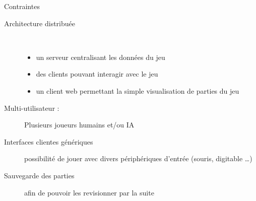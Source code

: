 \begin{frame}[c]
  \begin{block}{Contraintes}
\begin{description}
\item[Architecture distribuée]
~
  \begin{itemize}
  \item un serveur centralisant les données du jeu
  \item des clients pouvant interagir avec le jeu
  \item un client web permettant la simple visualisation de parties du jeu
  \end{itemize}
\item[Multi-utilisateur :] Plusieurs joueurs humains et/ou IA 
\item[Interfaces clientes génériques] possibilité de jouer avec divers périphériques d'entrée (souris, digitable \dots)
\item[Sauvegarde des parties] afin de pouvoir les revisionner par la suite
\end{description}

  \end{block}
\end{frame}